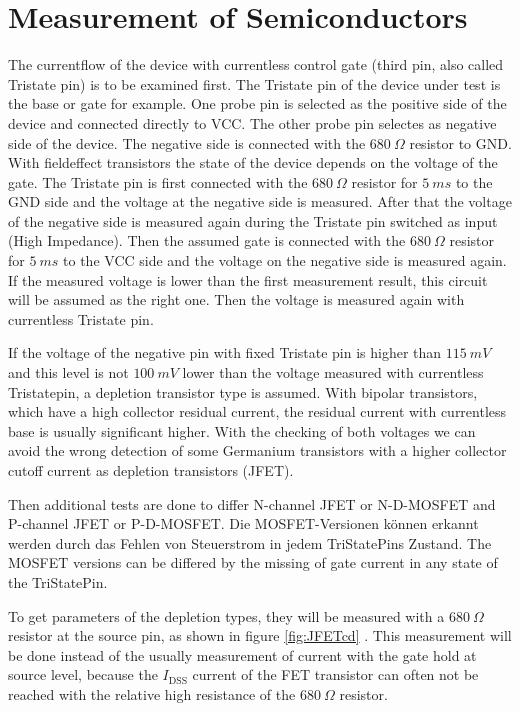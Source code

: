 	\section{Measurement of Semiconductors}
	The currentflow of the device with currentless control gate (third pin, also called Tristate pin)
is to be examined first.
The Tristate pin of the device under test is the base or gate for example.
One probe pin is selected as the positive side of the device and connected directly to VCC.
The other probe pin  selectes as negative side of the device.
The negative side is connected with the \(680~\Omega\) resistor to GND.
With fieldeffect transistors the state of the device depends on the voltage of the gate.
The Tristate pin is first connected with the \(680~\Omega\) resistor for \(5~ms\) to the GND side and
the voltage at the negative side is measured.
After that the voltage of the negative side is measured again during the Tristate pin switched
as input (High Impedance).
Then the assumed gate is connected with the \(680~\Omega\) resistor for \(5~ms\) to the VCC side and
the voltage on the negative side is measured again.
If the measured voltage is lower than the first measurement result, this circuit will
be assumed as the right one. Then the voltage is measured again with currentless Tristate pin.

If the voltage of the negative pin with fixed Tristate pin is higher than \(115~mV\) and
this level is not \(100~mV\) lower than the voltage measured with currentless Tristatepin,
a depletion transistor type is assumed.
With bipolar transistors, which have a high collector residual current,
the residual current with currentless base is usually significant higher.
With the checking of both voltages we can avoid the wrong detection of some Germanium transistors with a higher
collector cutoff current as depletion transistors (JFET).

Then additional tests are done 
to differ N-channel JFET or N-D-MOSFET and P-channel JFET or P-D-MOSFET.
Die MOSFET-Versionen können erkannt werden durch das Fehlen von Steuerstrom in jedem
TriStatePins Zustand.
The MOSFET versions can be differed by the missing of gate current in any state
of the TriStatePin.

To get parameters of the depletion types, they will be measured with a \(680~\Omega\) resistor at
the source pin, as shown in figure \ref{fig:JFETcd} . This measurement will be done instead of the
usually measurement of current with the gate hold at source level, because
the \(I_\mathrm{DSS}\) current of the FET transistor can often not be reached
with the relative high resistance of the \(680~\Omega\) resistor.

